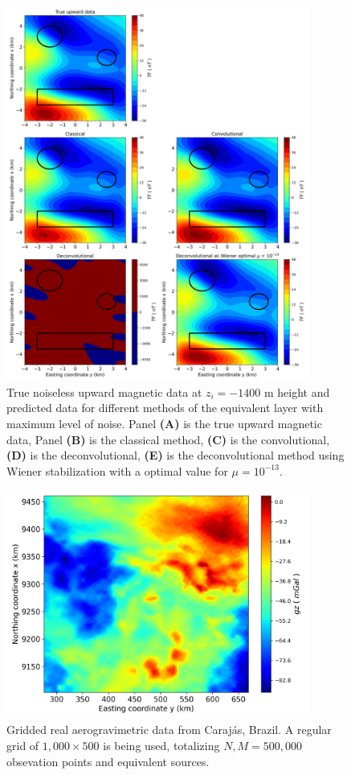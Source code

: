 \begin{figure}[htbp]
	\begin{center}
		\includegraphics[width=10cm]{Fig/mag_upward}
	\end{center}
	\caption{True noiseless upward magnetic data at $z_i = -1400$ m height and predicted data for different methods of the equivalent layer with maximum level of noise. Panel \textbf{(A)} is the true upward magnetic data, Panel \textbf{(B)} is the classical method, \textbf{(C)} is the convolutional, \textbf{(D)} is the deconvolutional, \textbf{(E)} is the deconvolutional method using Wiener stabilization with a optimal value for $\mu = 10^{-13}$.}
	\label{fig:mag_up}
\end{figure}

\begin{figure}[htbp]
	\begin{center}
		\includegraphics[width=10cm]{Fig/carajas_gz_real_data_1000x500}
	\end{center}
	\caption{Gridded real aerogravimetric data from Carajás, Brazil. A regular grid of $1,000 \times 500$ is being used, totalizing $N,M = 500, 000$ obsevation points and equivalent sources.}
	\label{fig:9}
\end{figure}

